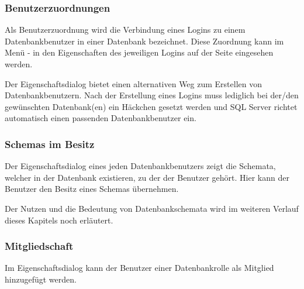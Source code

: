          \subsubsection{Benutzerzuordnungen}
            Als Benutzerzuordnung wird die Verbindung eines Logins
            zu einem Datenbankbenutzer in einer Datenbank bezeichnet. Diese
            Zuordnung kann im Menü  -
             in den Eigenschaften des jeweiligen Logins
            auf der Seite  eingesehen werden.
            \begin{merke}
              Der Eigenschaftsdialog  bietet einen
              alternativen Weg zum Erstellen von Datenbankbenutzern. Nach der
              Erstellung eines Logins muss lediglich bei der/den gewünschten
              Datenbank(en) ein Häckchen gesetzt werden und SQL Server richtet
              automatisch einen passenden Datenbankbenutzer ein.
            \end{merke}
          \subsubsection{Schemas im Besitz}
            Der Eigenschaftsdialog  eines jeden
            Datenbankbenutzers zeigt die Schemata, welcher in der Datenbank
            existieren, zu der der Benutzer gehört. Hier kann der Benutzer den
            Besitz eines Schemas übernehmen.
            \begin{merke}
              Der Nutzen und die Bedeutung von Datenbankschemata wird im
              weiteren Verlauf dieses Kapitels noch erläutert.
            \end{merke}
          \subsubsection{Mitgliedschaft}
            Im Eigenschaftsdialog  kann der Benutzer
            einer Datenbankrolle als Mitglied hinzugefügt werden.
